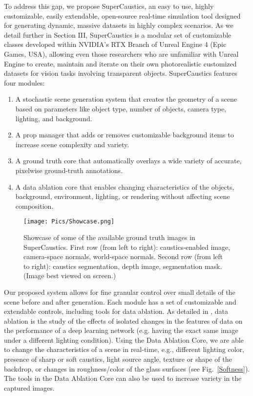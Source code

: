 \documentclass[conference]{IEEEtran}
\begin{document}
To address this gap, we propose SuperCaustics, an easy to use, highly customizable, easily extendable, open-source real-time simulation tool designed for generating dynamic, massive datasets in highly complex scenarios. As we detail further in Section III, SuperCaustics is a modular set of customizable classes developed within NVIDIA's RTX Branch of Unreal Engine 4 (Epic Games, USA)\cite{unrealengine,nvidia-github-repository}, allowing even those researchers who are unfamiliar with Unreal Engine to create, maintain and iterate on their own photorealistic customized datasets for vision tasks involving transparent objects. SuperCaustics features four modules: 

\begin{enumerate}
    \item A stochastic scene generation system that creates the geometry of a scene based on parameters like object type, number of objects, camera type, lighting, and background.
    \item A prop manager that adds or removes customizable background items to increase scene complexity and variety.
    \item A ground truth core that automatically overlays a wide variety of accurate, pixelwise ground-truth annotations.
    \item A data ablation core \cite{AIP} that enables changing characteristics of the objects, background, environment, lighting, or rendering without affecting scene composition.
\end{enumerate}


\begin{figure}

 \center

  \texttt{[image: Pics/Showcase.png]}

  \caption{Showcase of some of the available ground truth images in SuperCaustics. First row (from left to right): caustics-enabled image, camera-space normals, world-space normals.
  Second row (from left to right): caustics segmentation, depth image, segmentation mask. (Image best viewed on screen.)} 

  \label{GTShow}

\end{figure}


Our proposed system allows for fine granular control over small details of the scene before and after generation. Each module has a set of customizable and extendable controls, including tools for data ablation. As detailed in \cite{AIP}, data ablation is the study of the effects of isolated changes in the features of data on the performance of a deep learning network (e.g. having the exact same image under a different lighting condition). Using the Data Ablation Core, we are able to change the characteristics of a scene in real-time, e.g., different lighting color, presence of sharp or soft caustics, light source angle, texture or shape of the backdrop, or changes in roughness/color of the glass surfaces (see Fig.~\ref{Softness}). The tools in the Data Ablation Core can also be used to increase variety in the captured images. 
\end{document}
